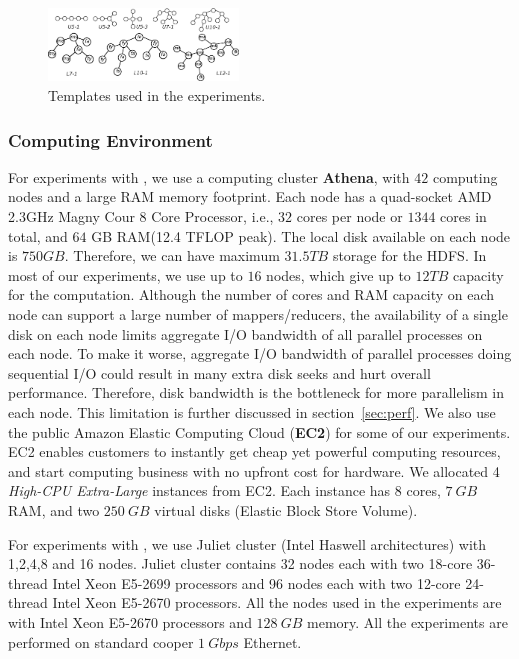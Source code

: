 \begin{figure}[htbp]
\centerline{\includegraphics[width=0.45\textwidth]{plots/templates.eps}}
\caption{Templates used in the experiments.}
\label{fig:templates}
\end{figure}

\subsubsection{Computing Environment}
For experiments with \sahad{}, we use a computing cluster \textbf{Athena},
with $42$ computing nodes and a large RAM memory footprint.  Each node has a
quad-socket AMD 2.3GHz Magny Cour 8 Core Processor, i.e., $32$ cores per node or
$1344$ cores in total, and $64$ GB RAM(12.4 TFLOP peak). The local disk
available on each node is $750GB$.  Therefore, we can have maximum $31.5TB$
storage for the HDFS. In most of our experiments, we use up to $16$ nodes, which
give up to $12TB$ capacity for the computation. Although the number of cores and
RAM capacity on each node can support a large number of mappers/reducers, the
availability of a single disk on each node limits aggregate I/O bandwidth of all
parallel processes on each node. To make it worse, aggregate I/O bandwidth of
parallel processes doing sequential I/O could result in many extra disk seeks
and hurt overall performance. Therefore, disk bandwidth is the bottleneck for
more parallelism in each node. This limitation is further discussed in
section~\ref{sec:perf}. We also use the public Amazon Elastic Computing Cloud
(\textbf{EC2}) for some of our experiments. EC2 enables customers to instantly
get cheap yet powerful computing resources, and start computing business with no
upfront cost for hardware. We allocated 4 \emph{High-CPU Extra-Large} instances
from EC2. Each instance has $8$ cores, $7~GB$ RAM, and two $250~GB$ virtual
disks (Elastic Block Store Volume).

For experiments with \harpsahad{}, we use Juliet cluster (Intel Haswell architectures)
with 1,2,4,8 and 16 nodes.  Juliet cluster contains 32 nodes each with two
18-core 36-thread Intel Xeon E5-2699 processors and 96 nodes each with two
12-core 24-thread Intel Xeon E5-2670 processors. All the nodes used in the
experiments are with Intel Xeon E5-2670 processors and $128~GB$ memory. All the
experiments are performed on standard cooper $1~Gbps$ Ethernet. 

